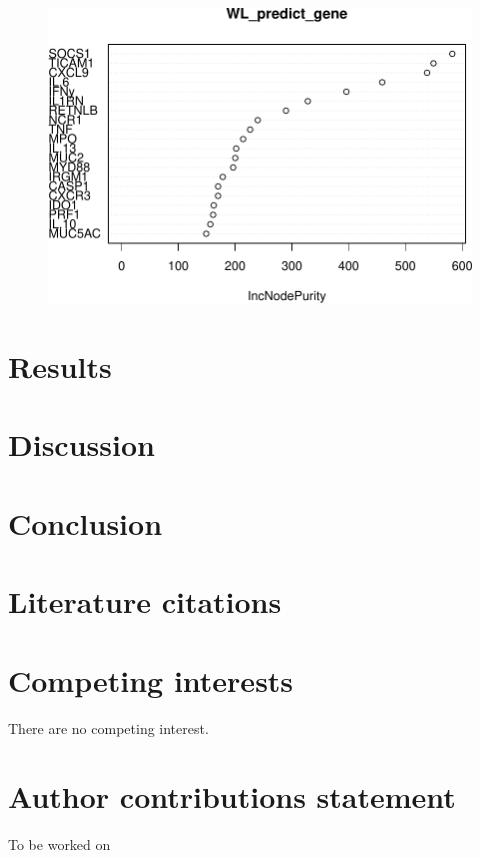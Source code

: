 \documentclass[webpdf,large,contemporary,namedate]{oup-authoring-template}
\theoremstyle{thmstyleone}
\theoremstyle{thmstyletwo}
\theoremstyle{thmstylethree}
\begin{document}
\begin{figure}[th]
\includegraphics[width=1\linewidth]{Article_hybrids_tolerance_files/figure-latex/fig6-1} \end{figure}

\hypertarget{results}{%
\section{Results}\label{results}}

\hypertarget{discussion}{%
\section{Discussion}\label{discussion}}

\hypertarget{conclusion}{%
\section{Conclusion}\label{conclusion}}

\hypertarget{literature-citations}{%
\section{Literature citations}\label{literature-citations}}

\section{Competing interests}

There are no competing interest.

\section{Author contributions statement}

To be worked on


\renewcommand\refname{References}




\end{document}
